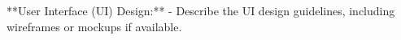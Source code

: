 **User Interface (UI) Design:**
   - Describe the UI design guidelines, including wireframes or mockups if available.